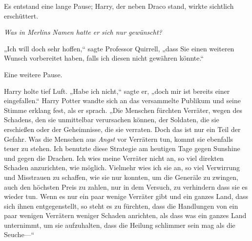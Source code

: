 Es entstand eine lange Pause; Harry, der neben Draco stand, wirkte sichtlich erschüttert.

\emph{Was in Merlins Namen hatte er sich nur gewünscht?}

„Ich will doch sehr hoffen,“ sagte Professor Quirrell, „dass Sie einen weiteren Wunsch vorbereitet haben, falls ich diesen nicht gewähren könnte.“

Eine weitere Pause.

Harry holte tief Luft. „Habe ich nicht,“ sagte er, „doch mir ist bereits einer eingefallen.“ Harry Potter wandte sich an das versammelte Publikum und seine Stimme erklang fest, als er sprach. „Die Menschen fürchten Verräter, wegen des Schadens, den sie unmittelbar verursachen können, der Soldaten, die sie erschießen oder der Geheimnisse, die sie verraten. Doch das ist nur ein Teil der Gefahr. Was die Menschen aus \emph{Angst} vor Verrätern tun, kommt sie ebenfalls teuer zu stehen. Ich benutzte diese Strategie am heutigen Tage gegen Sunshine und gegen die Drachen. Ich wies meine Verräter nicht an, so viel direkten Schaden anzurichten, wie möglich. Vielmehr wies ich sie an, so viel Verwirrung und Misstrauen zu schaffen, wie sie nur konnten, um die Generäle zu zwingen, auch den höchsten Preis zu zahlen, nur in dem Versuch, zu verhindern dass sie es wieder tun. Wenn es nur ein paar wenige Verräter gibt und ein ganzes Land, dass sich ihnen entgegenstellt, so steht es zu fürchten, dass die Handlungen von ein paar wenigen Verrätern weniger Schaden anrichten, als dass was ein ganzes Land unternimmt, um sie aufzuhalten, dass die Heilung schlimmer sein mag als die Seuche—“

